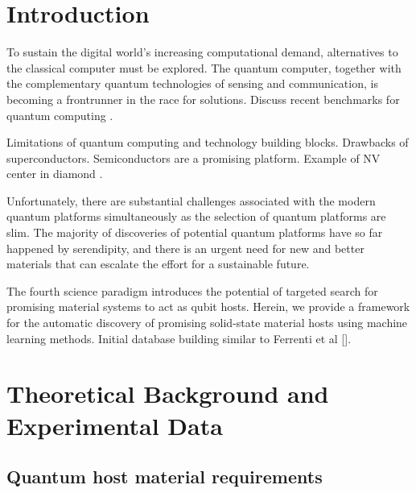 \documentclass[superscriptaddress,unsortedaddress,
 amsmath,amssymb,
 aps,
]{revtex4-2}
\begin{document}




\maketitle

% 

\section{Introduction}
To sustain the digital world’s increasing computational demand, alternatives to the classical computer must be explored. The quantum computer, together with the complementary quantum technologies of sensing and communication, is becoming a frontrunner in the race for solutions. 
Discuss recent benchmarks for quantum computing \cite{Arute_2019}. 

Limitations of quantum computing and technology building blocks. Drawbacks of superconductors. Semiconductors are a promising platform. Example of NV center in diamond \cite{Doherty_2013}. 

Unfortunately, there are substantial challenges associated with the modern quantum platforms simultaneously as the selection of quantum platforms are slim. The majority of discoveries of potential quantum platforms have so far happened by serendipity, and there is an urgent need for new and better materials that can escalate the effort for a sustainable future. 

The fourth science paradigm introduces the potential of targeted search for promising material systems to act as qubit hosts. 
Herein, we provide a framework for the automatic discovery of promising solid-state material hosts using machine learning methods. 
Initial database building similar to Ferrenti et al []. 

\section{Theoretical Background and Experimental Data} 

\subsection{Quantum host material requirements}
\end{document}
